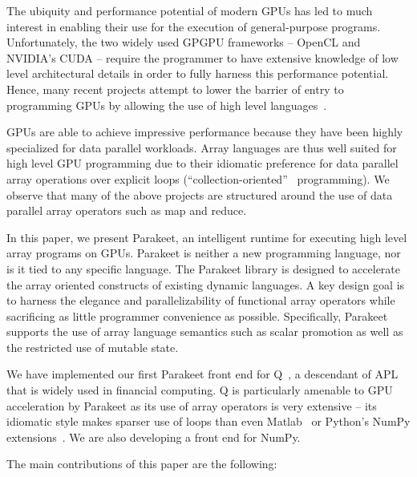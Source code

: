 \documentclass[preprint]{sigplanconf}
\begin{document}
The ubiquity and performance potential of modern GPUs has led to much interest in enabling their use for the execution of general-purpose programs. Unfortunately, the two widely used GPGPU frameworks -- OpenCL \cite{Muns10} and NVIDIA's CUDA \cite{NvidCU} -- require the programmer to have extensive knowledge of low level architectural details in order to fully harness this performance potential. Hence, many recent projects attempt to lower the barrier of entry to programming GPUs by allowing the use of high level languages~\cite{Cata11,Chaf11,Chak11,Main10,Sven08,Tard06}.

GPUs are able to achieve impressive performance because they have been highly specialized for data parallel workloads.  Array languages are thus well suited for high level GPU programming due to their idiomatic preference for data parallel array operations over explicit loops (``collection-oriented''~\cite{Sip91} programming). We observe that many of the above projects are structured around the use of data parallel array operators such as map and reduce.

In this paper, we present Parakeet, an intelligent runtime for executing high level array programs on GPUs. Parakeet is neither a new programming language, nor is it tied to any specific language. The Parakeet library is designed to accelerate the array oriented constructs of existing dynamic languages. A key design goal is to harness the elegance and parallelizability of functional array operators while sacrificing as little programmer convenience as possible.  Specifically, Parakeet supports the use of array language semantics such as scalar promotion as well as the restricted use of mutable state.

We have implemented our first Parakeet front end for Q~\cite{Borr08}, a descendant of APL that is widely used in financial computing. Q is particularly amenable to GPU acceleration by Parakeet as its use of array operators is very extensive -- its idiomatic style makes sparser use of loops than even Matlab~\cite{Moler80} or Python's NumPy extensions~\cite{Oliphant07}. We are also developing a front end for NumPy.

The main contributions of this paper are the following:
\end{document}
